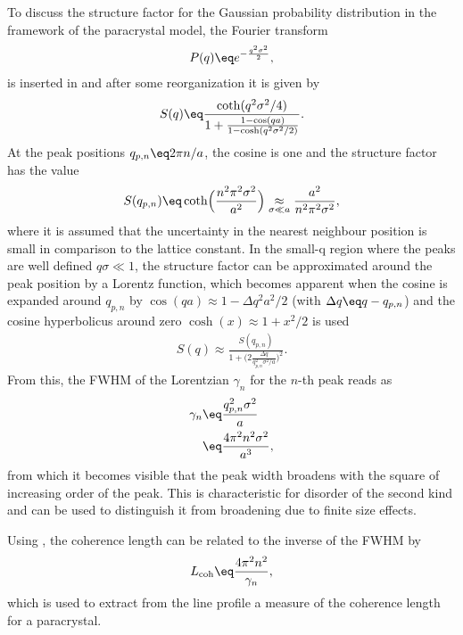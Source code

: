 \documentclass[\main/dresen_thesis.tex]{subfiles}
\begin{document}
    To discuss the structure factor for the Gaussian probability distribution in the framework of the paracrystal model, the Fourier transform
    \begin{align}
      P(q) \eq e^{-\frac{q^2 \sigma^2}{2}},
    \end{align}
    is inserted in  and after some reorganization it is given by
    \begin{align}
      S(q) \eq \frac{\coth(q^2 \sigma^2/4)}{1 + \frac{1 - \cos(qa)}{1 - \cosh(q^2 \sigma^2/2)}}.
    \end{align}
    At the peak positions $q_{p, n} \eq 2 \pi n/a$, the cosine is one and the structure factor has the value
    \begin{align}
      S(q_{p, n}) \eq \coth \Bigl( \frac{n^2 \pi^2 \sigma^2}{a^2} \Bigr) \underset{\sigma \ll a}{\approx} \frac{a^2}{n^2 \pi^2 \sigma^2},
    \end{align}
    where it is assumed that the uncertainty in the nearest neighbour position is small in comparison to the lattice constant.
    In the small-q region where the peaks are well defined $q \sigma \ll 1$, the structure factor can be approximated around the peak position by a Lorentz function, which becomes apparent when the cosine is expanded around $q_{p, n}$ by $\cos(qa) \approx 1 - \Delta q^2 a^2 /2$ (with $\Delta q \eq q - q_{p, n}$) and the cosine hyperbolicus around zero $\cosh(x) \approx 1 + x^2/2$ is used
    \begin{align}
      S(q) \approx \frac{S(q_{p, n})}{1 + \biggl(2\frac{\Delta q}{q_{p,n}^2 \sigma^2/a} \biggr)^2}.
    \end{align}
    From this, the FWHM of the Lorentzian $\gamma_n$ for the $n$-th peak reads as
    \begin{align}\begin{split}
      \gamma_n \eq& \frac{q_{p,n}^2 \sigma^2}{a}\\
      \eq& \frac{4 \pi^2 n^2 \sigma^2}{a^3},
    \end{split}\end{align}
    from which it becomes visible that the peak width broadens with the square of increasing order of the peak.
    This is characteristic for disorder of the second kind and can be used to distinguish it from broadening due to finite size effects.

    Using , the coherence length can be related to the inverse of the FWHM by
    \begin{align}
      L_\mathrm{coh} \eq \frac{4 \pi^2 n^2}{\gamma_n},\label{eq:appendix:calculations:paracrystal:CoherenceFWHMEquation}
    \end{align}
    which is used to extract from the line profile a measure of the coherence length for a paracrystal.
\end{document}
